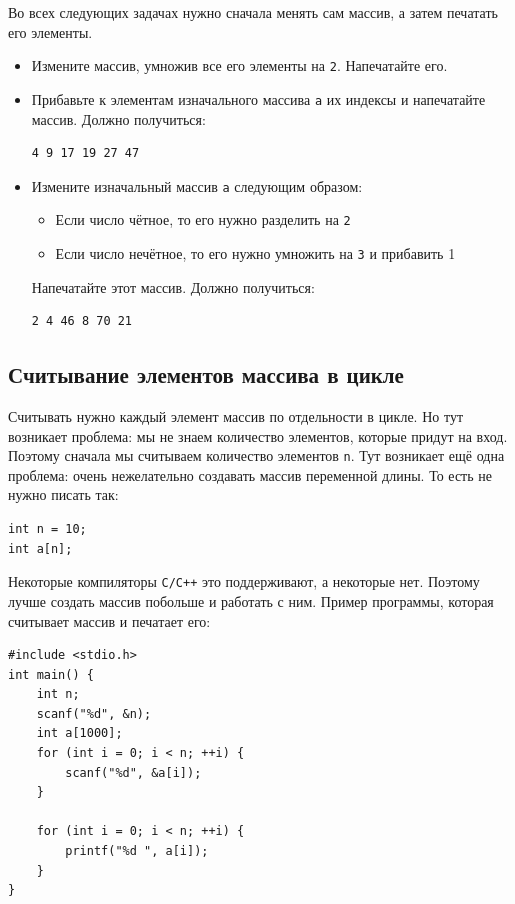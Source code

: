 \documentclass{article}
\begin{document}
Во всех следующих задачах нужно сначала менять сам массив, а затем печатать его элементы.
\begin{itemize}
\item Измените массив, умножив все его элементы на \texttt{2}. Напечатайте его.
\item Прибавьте к элементам изначального массива \texttt{a} их индексы и напечатайте массив. Должно получиться:
\begin{verbatim}
4 9 17 19 27 47
\end{verbatim}
\item Измените изначальный массив \texttt{a} следующим образом:
\begin{itemize}
\item Если число чётное, то его нужно разделить на \texttt{2}
\item Если число нечётное, то его нужно умножить на \texttt{3} и прибавить 1
\end{itemize}
Напечатайте этот массив. Должно получиться:
\begin{verbatim}
2 4 46 8 70 21
\end{verbatim}
\end{itemize}


\subsection*{Считывание элементов массива в цикле}
Считывать нужно каждый элемент массив по отдельности в цикле. Но тут возникает проблема: мы не знаем количество элементов, которые придут на вход. Поэтому сначала мы считываем количество элементов \texttt{n}. Тут возникает ещё одна проблема: очень нежелательно создавать массив переменной длины. То есть не нужно писать так:
\begin{lstlisting}
int n = 10;
int a[n];
\end{lstlisting}
Некоторые компиляторы \texttt{С/C++} это поддерживают, а некоторые нет. Поэтому лучше создать массив побольше и работать с ним. Пример программы, которая считывает массив и печатает его:
\begin{lstlisting}
#include <stdio.h>
int main() {
    int n;
    scanf("%d", &n);
    int a[1000];
    for (int i = 0; i < n; ++i) {
        scanf("%d", &a[i]);
    }
    
    for (int i = 0; i < n; ++i) {
        printf("%d ", a[i]);
    }    
}
\end{lstlisting}
\end{document}
